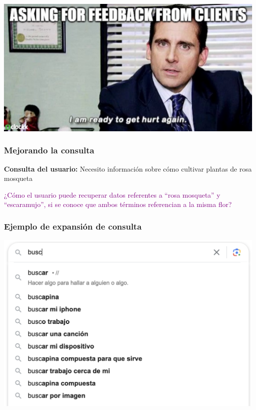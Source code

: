 \documentclass[
10pt, %
aspectratio=169, %
]{beamer}
\begin{document}
	{
		{%
			\includegraphics[width=\paperwidth,height=\paperheight]{feedback.jpg}
		}
		
		\begin{frame}
		\end{frame}
	}
	
	\begin{frame}
		
		\frametitle{Mejorando la consulta}
		
		\textbf{Consulta del usuario:} Necesito información sobre cómo cultivar plantas de rosa mosqueta 
		
		\vspace{4\baselineskip}
				
		\textcolor{purple}{¿Cómo el usuario puede recuperar datos referentes a ``rosa mosqueta'' y ``escaramujo'', si se conoce que ambos términos referencian a la misma flor?}		
		
	\end{frame}
	
	\begin{frame}
		
		\frametitle{Ejemplo de expansión de consulta}
		
		\centering
		\includegraphics[scale=0.5]{expansion.png}
		
	\end{frame}
	
\end{document}
